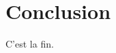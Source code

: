 \documentclass[french,nochapter,11pt]{rapportUB}
\begin{document}
\FloatBarrier

\section{Conclusion}
\label{sec:conclusion}
C'est la fin.



\printbibliography
\end{document}

